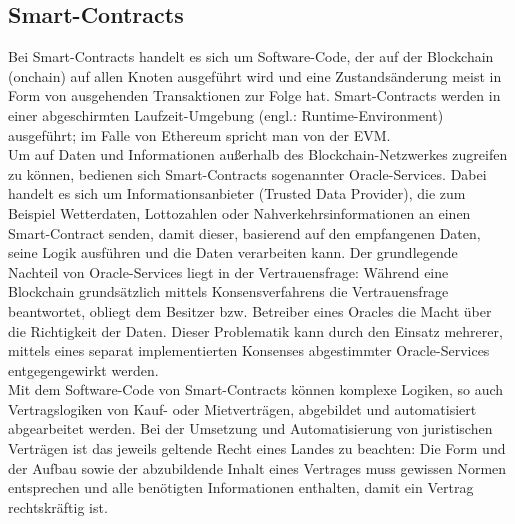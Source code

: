 \subsection{Smart-Contracts}
\label{subsec:fundamentals:dlt:smartcontracts}
Bei Smart-Contracts handelt es sich um Software-Code, der auf der Blockchain (onchain) auf allen Knoten ausgeführt wird und eine Zustandsänderung meist in Form von ausgehenden Transaktionen zur Folge hat. Smart-Contracts werden in einer abgeschirmten Laufzeit-Umgebung (engl.: Runtime-Environment) ausgeführt; im Falle von Ethereum spricht man von der \ac{EVM}. \cite{smartcontracts2017}\\
Um auf Daten und Informationen außerhalb des Blockchain-Netzwerkes zugreifen zu können, bedienen sich Smart-Contracts sogenannter Oracle-Services. Dabei handelt es sich um Informationsanbieter (Trusted Data Provider), die zum Beispiel Wetterdaten, Lottozahlen oder Nahverkehrsinformationen an einen Smart-Contract senden, damit dieser, basierend auf den empfangenen Daten, seine Logik ausführen und die Daten verarbeiten kann. Der grundlegende Nachteil von Oracle-Services liegt in der Vertrauensfrage: Während eine Blockchain grundsätzlich mittels Konsensverfahrens die Vertrauensfrage beantwortet, obliegt dem Besitzer bzw. Betreiber eines Oracles die Macht über die Richtigkeit der Daten. Dieser Problematik kann durch den Einsatz mehrerer, mittels eines separat implementierten Konsenses abgestimmter Oracle-Services entgegengewirkt werden. \cite{ORACLE2019}\\
Mit dem Software-Code von Smart-Contracts können komplexe Logiken, so auch Vertragslogiken von Kauf- oder Mietverträgen, abgebildet und automatisiert abgearbeitet werden. Bei der Umsetzung und Automatisierung von juristischen Verträgen ist das jeweils geltende Recht eines Landes zu beachten: Die Form und der Aufbau sowie der abzubildende Inhalt eines Vertrages muss gewissen Normen entsprechen und alle benötigten Informationen enthalten, damit ein Vertrag rechtskräftig ist. \cite{smartcontracts2017}

